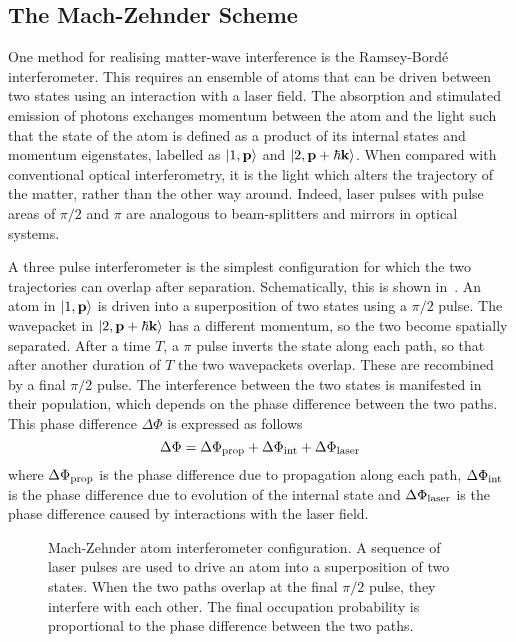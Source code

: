 \subsection{The Mach-Zehnder Scheme}\label{subsec:theory_mz}
One method for realising matter-wave interference is the
Ramsey-Bord\'e interferometer. This requires an ensemble
of atoms that can be driven between two states using an interaction
with a laser field. The absorption and stimulated emission of photons
exchanges momentum between the atom and the light such that the state
of the atom is defined as a product of its internal states and
momentum eigenstates, labelled as $\ket{1,\textbf{p}}$ and
$\ket{2,\textbf{p} + \hbar \textbf{k}}$. When compared with
conventional optical interferometry, it is the light which alters the
trajectory of the matter, rather than the other way around. Indeed,
laser pulses with pulse areas of $\pi/2$ and $\pi$ are analogous to
beam-splitters and mirrors in optical systems.  
\par\noindent
A three pulse interferometer is the simplest configuration for which
the two trajectories can overlap after separation. Schematically, this
is shown in~. An atom in
$\ket{1,\textbf{p}}$ is driven into a superposition of two states
using a $\pi/2$ pulse. The wavepacket in $\ket{2,\textbf{p} + \hbar
\textbf{k}}$ has a different momentum, so the two become
spatially separated. After a time $T$, a $\pi$ pulse inverts the state
along each path, so that after another duration of $T$ the two
wavepackets overlap. These are recombined by a final $\pi/2$ pulse.
The interference between the two states is manifested in their
population, which depends on the phase difference between the two
paths. This phase difference $\Delta \Phi$ is expressed as follows
\begin{equation}
  \label{eq:phase_difference}
  \Delta \Phi = \Delta \Phi_\textnormal{prop} +\Delta
  \Phi_\textnormal{int}+\Delta \Phi_\textnormal{laser}
\end{equation}
where $\Delta \Phi_\textnormal{prop}$ is the phase difference due to
propagation along each path, $\Delta \Phi_\textnormal{int}$ is the
phase difference due to evolution of the internal state and $\Delta
\Phi_\textnormal{laser}$ is the phase difference caused by
interactions with the laser field.   
\begin{figure}[htpb]
  \centering
  \resizebox{0.8\textwidth}{!}{}
  \caption[Mach-Zehnder atom interferometer configuration.]{Mach-Zehnder atom interferometer configuration. A sequence
  of laser pulses are used to drive an atom into a superposition of
two states. When the two paths overlap at the final $\pi/2$ pulse,
they interfere with each other. The final occupation probability is
proportional to the phase difference between the two paths.}
  \label{fig:interferometer}
\end{figure}

